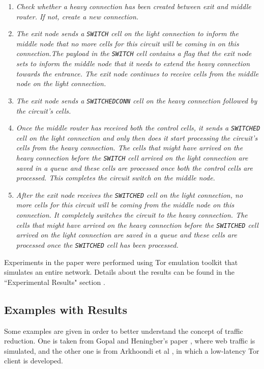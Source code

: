 \documentclass[a4paper, 12pt, titlepage]{article}
\begin{document}
\begin{enumerate}
\item{\textit{Check whether a heavy connection has been created between exit and middle router. If not, create a new connection.}}
\item{\textit{The exit node sends a \texttt{SWITCH} cell on the light connection to inform the middle node that no more cells for this circuit will be coming in on this connection.The payload in the \texttt{SWITCH} cell contains a flag that the exit node sets to inform the middle node that it needs to extend the heavy connection towards the entrance. The exit node continues to receive cells from the middle node on the light connection.}}
\item{\textit{The exit node sends a \texttt{SWITCHED\textunderscore CONN} cell on the heavy connection followed by the circuit's cells.}}
\item{\textit{Once the middle router has received both the control cells, it sends a \texttt{SWITCHED} cell on the light connection and only then does it start processing the circuit's cells from the heavy connection. The cells that might have arrived on the heavy connection before the \texttt{SWITCH} cell arrived on the light connection are saved in a queue and these cells are processed once both the control cells are processed. This completes the circuit switch on the middle node.}}
\item{\textit{After the exit node receives the \texttt{SWITCHED} cell on the light connection, no more cells for this circuit will be coming from the middle node on this connection. It completely switches the circuit to the heavy connection. The cells that might have arrived on the heavy connection before the \texttt{SWITCHED} cell arrived on the light connection are saved in a queue and these cells are processed once the \texttt{SWITCHED} cell has been processed.}}
\end{enumerate}
Experiments in the paper were performed using Tor emulation toolkit that simulates an entire network. Details about the results can be found in the ``Experimental Results" section \cite{TorTrafficReduce}.

\subsection{Examples with Results}
Some examples are given in order to better understand the concept of traffic reduction. One is taken from Gopal and Heningber's paper \cite{TorTrafficReduce}, where web traffic is simulated, and the other one is from Arkhoondi et al \cite{LASTor}, in which a low-latency Tor client is developed.
\end{document}
